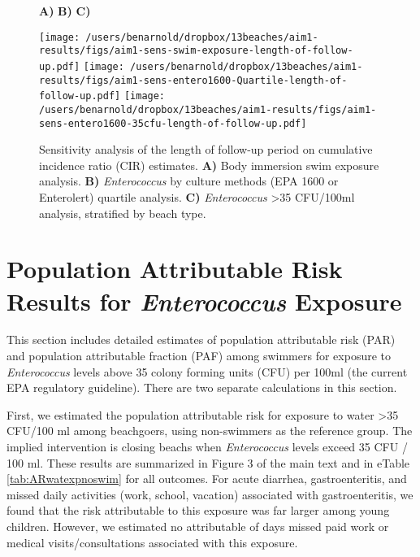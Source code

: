 \documentclass[12pt]{article}\usepackage[]{graphicx}\usepackage[]{color}
\begin{document}
\begin{landscape}
\begin{figure}[htbp]
{\large \hspace{1cm} \textbf{A)} \hspace{7cm} \textbf{B)}    \hspace{7cm} \textbf{C)} }\\

\begin{center}
 \texttt{[image: /users/benarnold/dropbox/13beaches/aim1-results/figs/aim1-sens-swim-exposure-length-of-follow-up.pdf]} 
 \texttt{[image: /users/benarnold/dropbox/13beaches/aim1-results/figs/aim1-sens-entero1600-Quartile-length-of-follow-up.pdf]} 
  \texttt{[image: /users/benarnold/dropbox/13beaches/aim1-results/figs/aim1-sens-entero1600-35cfu-length-of-follow-up.pdf]} 

\begin{minipage}{1.2\textwidth}

\caption{Sensitivity analysis of the length of follow-up period on cumulative incidence ratio (CIR) estimates. \textbf{A)} Body immersion swim exposure analysis. \textbf{B)} \textit{Enterococcus} by culture methods (EPA 1600 or Enterolert) quartile analysis. \textbf{C)} \textit{Enterococcus} >35 CFU/100ml analysis, stratified by beach type. \label{fig:fulengthsens} }
\end{minipage}
\end{center}
\end{figure}
\end{landscape}

\clearpage
\section{Population Attributable Risk Results for \textit{Enterococcus} Exposure}

This section includes detailed estimates of population attributable risk (PAR) and population attributable fraction (PAF) among swimmers for exposure to \textit{Enterococcus} levels above 35 colony forming units (CFU) per 100ml (the current EPA regulatory guideline). There are two separate calculations in this section. 

First, we estimated the population attributable risk for exposure to water >35 CFU/100 ml among beachgoers, using non-swimmers as the reference group. The implied intervention is closing beachs when \textit{Enterococcus} levels exceed 35 CFU / 100 ml.  These results are summarized in Figure 3 of the main text and in eTable \ref{tab:ARwatexpnoswim} for all outcomes. For acute diarrhea, gastroenteritis, and missed daily activities (work, school, vacation) associated with gastroenteritis, we found that the risk attributable to this exposure was far larger among young children. However, we estimated no attributable of days missed paid work or medical visits/consultations associated with this exposure.
\end{document}
